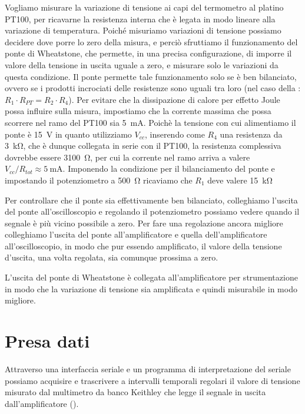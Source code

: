 \documentclass[
    rmp,
    reprint, 
    superscriptaddress, 
    altaffilletter, 
    amsmath, 
    amssymb,
    a4paper]{revtex4-2}
\begin{document}
Vogliamo misurare la variazione di tensione ai capi del termometro al platino PT100, per ricavarne la resistenza interna che è legata in modo lineare alla variazione di temperatura. Poiché misuriamo variazioni di tensione possiamo decidere dove porre lo zero della misura, e perciò sfruttiamo il funzionamento del ponte di Wheatstone, che permette, in una precisa configurazione, di imporre il valore della tensione in uscita uguale a zero, e misurare solo le variazioni da questa condizione. Il ponte permette tale funzionamento solo se è ben bilanciato, ovvero se i prodotti incrociati delle resistenze sono uguali tra loro (nel caso della : $R_1\cdot R_{PT}=R_2\cdot R_4$). Per evitare che la dissipazione di calore per effetto Joule possa influire sulla misura, impostiamo che la corrente massima che possa scorrere nel ramo del PT100 sia \SI{5}{\milli\ampere}. Poichè la tensione con cui alimentiamo il ponte è \SI{15}{\volt} in quanto utilizziamo $V_{cc}$, inserendo come $R_4$ una resistenza da \SI{3}{\kilo\ohm}, che è dunque collegata in serie con il PT100, la resistenza complessiva dovrebbe essere \SI{3100}{\ohm}, per cui la corrente nel ramo arriva a valere $V_{cc}/R_{tot}\approx\SI{5}{\milli\ampere}$. Imponendo la condizione per il bilanciamento del ponte e impostando il potenziometro a \SI{500}{\ohm} ricaviamo che $R_1$ deve valere \SI{15}{\kilo\ohm} 

Per controllare che il ponte sia effettivamente ben bilanciato, colleghiamo l'uscita del ponte all'oscilloscopio e regolando il potenziometro possiamo vedere quando il segnale è più vicino possibile a zero. Per fare una regolazione ancora migliore colleghiamo l'uscita del ponte all'amplificatore e quella dell'amplificatore all'oscilloscopio, in modo che pur essendo amplificato, il valore della tensione d'uscita, una volta regolata, sia comunque prossima a zero.

L'uscita del ponte di Wheatstone è collegata all'amplificatore per strumentazione in modo che la variazione di tensione sia amplificata e quindi misurabile in modo migliore. 


\section*{Presa dati}
Attraverso una interfaccia seriale e un programma di interpretazione del seriale possiamo acquisire e trascrivere a intervalli temporali regolari il valore di tensione misurato dal multimetro da banco Keithley che legge il segnale in uscita dall'amplificatore ().
\end{document}
